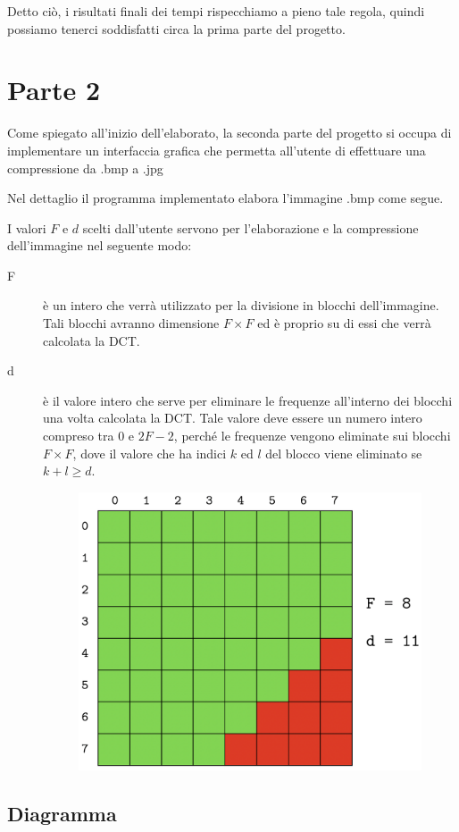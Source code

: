 \documentclass[preprint,12pt]{elsarticle}
\begin{document}
	Detto ciò, i risultati finali dei tempi rispecchiamo a pieno tale regola, quindi possiamo tenerci soddisfatti circa la prima parte del progetto. 
	
	\newpage
	
	\section{Parte 2}
	Come spiegato all'inizio dell'elaborato, la seconda parte del progetto si occupa di implementare un interfaccia grafica che permetta all'utente di effettuare una compressione da .bmp a .jpg
	
	Nel dettaglio il programma implementato elabora l'immagine .bmp come segue.
	
	I valori $F$ e $d$ scelti dall'utente servono per l'elaborazione e la compressione dell'immagine nel seguente modo:
	\begin{description}
		\item[F] è un intero che verrà utilizzato per la divisione in blocchi dell'immagine. Tali blocchi avranno dimensione $F \times F$ ed è proprio su di essi che verrà calcolata la DCT.
		\item[d] è il valore intero che serve per eliminare le frequenze all'interno dei blocchi una volta calcolata la DCT. Tale valore deve essere un numero intero compreso tra $0$ e $2F-2$, perché le frequenze vengono eliminate sui blocchi $F \times F$, dove il valore che ha indici $k$ ed $l$ del blocco viene eliminato se $k + l \geq d$. 
		\begin{figure}[h]
			\centering
			\includegraphics[width=0.5\linewidth]{esempio}
		\end{figure}
	\end{description}
	
	\subsection{Diagramma}
		
	\vspace{3mm}
		
\end{document}
